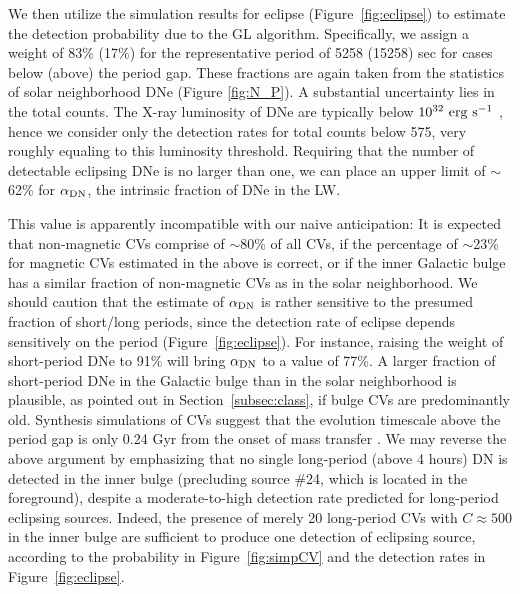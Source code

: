 \documentclass[fleqn,usenatbib]{mnras}
\begin{document}
We then utilize the simulation results for eclipse (Figure~\ref{fig:eclipse}) to estimate the detection probability due to the GL algorithm. Specifically, we assign a weight of 83\% (17\%) for the representative period of 5258 (15258) sec for cases below (above) the period gap. These fractions are again taken from the statistics of solar neighborhood DNe (Figure \ref{fig:N_P}). 
A substantial uncertainty lies in the total counts. The X-ray luminosity of DNe are typically below $\rm 10^{32}~erg~s^{-1}$ \citep{2016ApJ...818..136X}, hence we consider only the detection rates for total counts below 575, very roughly equaling to this luminosity threshold.
Requiring that the number of detectable eclipsing DNe is no larger than one,  
we can place an upper limit of $\sim$62\% for $\alpha_{\rm DN}$, the intrinsic fraction of DNe in the LW. 

This value is apparently incompatible with our naive anticipation: It is expected that non-magnetic CVs comprise of $\sim$80\% of all CVs, if the percentage of $\sim$23\% for magnetic CVs estimated in the above is correct, or if the inner Galactic bulge has a similar fraction of non-magnetic CVs as in the solar neighborhood.  
We should caution that the estimate of $\alpha_{\rm DN}$ is rather sensitive to the presumed fraction of short/long periods, since the detection rate of eclipse depends sensitively on the period (Figure~\ref{fig:eclipse}). 
For instance, raising the weight of short-period DNe to 91\% will bring $\alpha_{\rm DN}$ to a value of 77\%.
A larger fraction of short-period DNe in the Galactic bulge than in the solar neighborhood is plausible, as pointed out in Section~\ref{subsec:class}, if bulge CVs are predominantly old. 
Synthesis simulations of CVs suggest that the evolution timescale above the period gap is only 0.24 Gyr from the onset of mass transfer \citep{2011ApJS..194...28K}.
We may reverse the above argument by emphasizing that no single long-period (above 4 hours) DN is detected in the inner bulge (precluding source \#24, which is located in the foreground), despite a moderate-to-high detection rate predicted for long-period eclipsing sources. 
Indeed, the presence of merely 20 long-period CVs with $C \approx 500$ in the inner bulge are sufficient to produce one detection of eclipsing source, according to the probability in Figure~\ref{fig:simpCV} and the detection rates in Figure~\ref{fig:eclipse}.  
\end{document}
